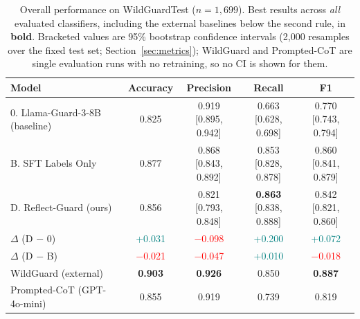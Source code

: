 \documentclass[Superintelligence,article,submit,pdftex,moreauthors]{Definitions/mdpi}
\begin{document}
\begin{table}[H]
  \caption{Overall performance on WildGuardTest ($n = 1{,}699$). Best results across \emph{all} evaluated classifiers, including the external baselines below the second rule, in \textbf{bold}. Bracketed values are 95\% bootstrap confidence intervals (2{,}000 resamples over the fixed test set; Section~\ref{sec:metrics}); WildGuard and Prompted-CoT are single evaluation runs with no retraining, so no CI is shown for them.\label{tab:wildguard_main}}
  \centering
  \small
  \begin{tabular}{lcccc}
    \toprule
    Model & Accuracy & Precision & Recall & F1 \\
    \midrule
    0. Llama-Guard-3-8B (baseline)
      & 0.825
      & \makecell{0.919\\{[0.895, 0.942]}}
      & \makecell{0.663\\{[0.628, 0.698]}}
      & \makecell{0.770\\{[0.743, 0.794]}} \\

    B. SFT Labels Only
      & 0.877
      & \makecell{0.868\\{[0.843, 0.892]}}
      & \makecell{0.853\\{[0.828, 0.878]}}
      & \makecell{0.860\\{[0.841, 0.879]}} \\

    D. Reflect-Guard (ours)
      & 0.856
      & \makecell{0.821\\{[0.793, 0.848]}}
      & \makecell{\textbf{0.863}\\{[0.838, 0.888]}}
      & \makecell{0.842\\{[0.821, 0.860]}} \\

    \midrule
    $\Delta$ (D $-$ 0)
      & \textcolor{teal}{+0.031}
      & \textcolor{red}{$-$0.098}
      & \textcolor{teal}{+0.200}
      & \textcolor{teal}{+0.072} \\

    $\Delta$ (D $-$ B)
      & \textcolor{red}{$-$0.021}
      & \textcolor{red}{$-$0.047}
      & \textcolor{teal}{+0.010}
      & \textcolor{red}{$-$0.018} \\

    \midrule
    WildGuard (external)
      & \textbf{0.903}
      & \textbf{0.926}
      & 0.850
      & \textbf{0.887} \\

    Prompted-CoT (GPT-4o-mini)
      & 0.855
      & 0.919
      & 0.739
      & 0.819 \\

    \bottomrule
  \end{tabular}
\end{table}
\end{document}
